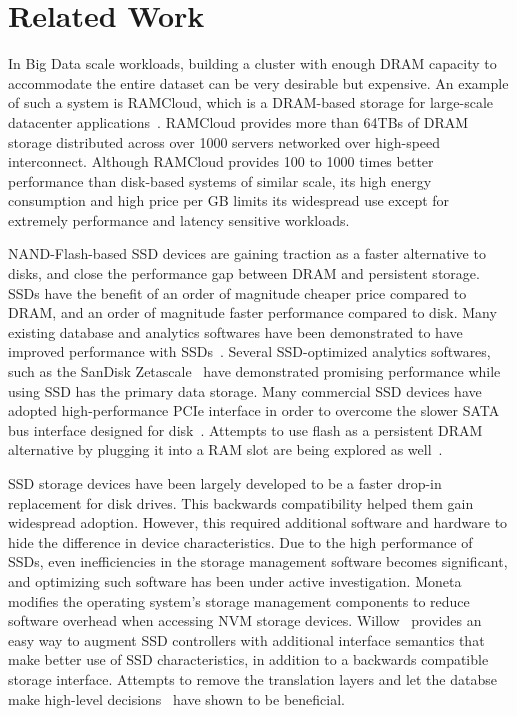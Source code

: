 
\section{Related Work}
\label{sec:related}


In Big Data scale workloads, building a cluster with enough DRAM capacity to
accommodate the entire dataset can be very desirable but expensive. An example
of such a system is RAMCloud, which is a DRAM-based storage for large-scale
datacenter applications~\cite{ramcloud, rumble_log_dram}.  RAMCloud provides more than 64TBs of DRAM
storage distributed across over 1000 servers networked over high-speed
interconnect. Although RAMCloud provides 100 to 1000 times better performance
than disk-based systems of similar scale, its high energy consumption and high
price per GB limits its widespread use except for extremely performance and
latency sensitive workloads.

NAND-Flash-based SSD devices are gaining traction as a faster alternative to
disks, and close the performance gap between DRAM and persistent storage.
SSDs have the benefit of an order of magnitude cheaper price compared to DRAM,
and an order of magnitude faster performance compared to disk.
Many existing database and analytics softwares have been demonstrated to have
improved performance with SSDs~\cite{hadoopperf,ssdhadoop,ssddatabase}.
Several SSD-optimized analytics softwares, such as the SanDisk
Zetascale~\cite{zetascale} have demonstrated promising
performance while using SSD has the primary data storage.
Many commercial SSD devices have adopted high-performance PCIe interface in
order to overcome the slower SATA bus interface designed for
disk~\cite{fusionio, violinmemory, intelnvme}. Attempts to
use flash as a persistent DRAM alternative by plugging it into a RAM slot
are being explored as well~\cite{diablotechnology}. 

SSD storage devices have been largely developed to be a faster drop-in
replacement for disk drives. This backwards compatibility helped them gain
widespread adoption.  However, this required additional software and hardware to
hide the difference in device characteristics.  Due to the high performance of
SSDs, even inefficiencies in the storage management software becomes
significant, and optimizing such software has been under active investigation.
Moneta~\cite{ucsd_moneta} modifies the operating system's storage management
components to reduce software overhead when accessing NVM storage devices.
Willow~\cite{ucsd_willow} provides an easy way to augment SSD controllers with
additional interface semantics that make better use of SSD characteristics, in
addition to a backwards compatible storage interface.  Attempts to remove the
translation layers and let the databse make high-level decisions~\cite{noftl}
have shown to be beneficial. 

